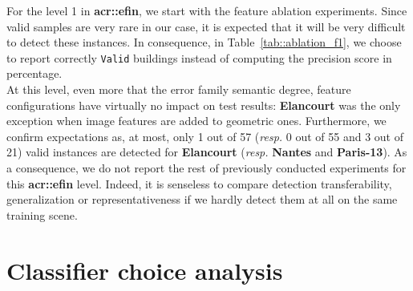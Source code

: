        For the level 1 in \textbf{\gls{acr::efin}}, we start with the feature ablation experiments.
        Since valid samples are very rare in our case, it is expected that it will be very difficult to detect these instances.
        In consequence, in Table~\ref{tab::ablation_f1}, we choose to report correctly \texttt{Valid} buildings instead of computing the precision score in percentage.\\
            
        At this level, even more that the error family semantic degree, feature configurations have virtually no impact on test results: \textbf{Elancourt} was the only exception when image features are added to geometric ones.
        Furthermore, we confirm expectations as, at most, only 1 out of 57 (\textit{resp.} 0 out of 55 and 3 out of 21) valid instances are detected for \textbf{Elancourt} (\textit{resp.} \textbf{Nantes} and \textbf{Paris-13}).
        As a consequence, we do not report the rest of previously conducted experiments for this \textbf{\gls{acr::efin}} level.
        Indeed, it is senseless to compare detection transferability, generalization or representativeness if we hardly detect them at all on the same training scene.

\section{Classifier choice analysis}
